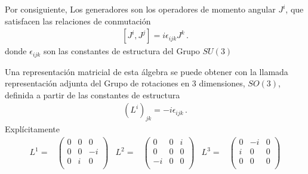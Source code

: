 Por consiguiente, Los generadores son los operadores de momento angular $ J^i$, que satisfacen las relaciones de conmutación
\begin{align}
\label{eq:rotgr}
  \left[J^i,J^j\right]=i\epsilon_{ijk}J^k\,.
\end{align}
donde $\epsilon_{ijk}$ son las constantes de estructura del Grupo $SU(3)$

Una representación matricial de esta álgebra se puede obtener con la llamada representación adjunta del Grupo de rotaciones en 3 dimensiones, $SO(3)$, definida a partir de las constantes de estructura \cite{Veltman}
\begin{align}
  (L^i)_{jk}=-i\epsilon_{ijk}\,.
\end{align}
Explícitamente
\begin{align*}
  L^1=&
  \begin{pmatrix}
   0 & 0 & 0\\
   0 & 0 & -i\\
   0 & i & 0 \\
  \end{pmatrix}&
 L^2=&
 \begin{pmatrix}
  0 & 0  & i \\ 
  0 & 0  & 0 \\
 -i & 0  & 0 \\
 \end{pmatrix}&
 L^3=&
 \begin{pmatrix}
   0 & -i & 0\\
   i & 0  & 0\\
   0 & 0 & 0\\
 \end{pmatrix}
\end{align*}

